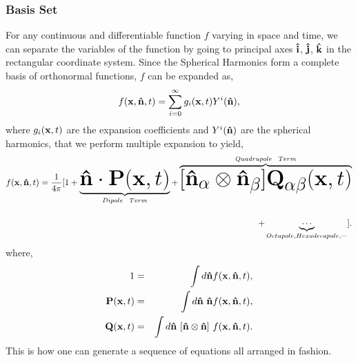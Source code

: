 \documentclass[onecolumn,12pt]{article}
\begin{document}
\subsubsection{Basis Set}
For any continuous and differentiable function $f$ varying in space and time, we can separate the variables of the function by going to principal axes ${\bf \hat{i}}$, ${\bf \hat{j}}$, ${\bf \hat{k}}$ in the rectangular coordinate system. Since the Spherical Harmonics form a complete basis of orthonormal functions,
$f$ can be expanded as,
\begin{equation}
f({\bf x},{\bf \hat{n}},t) = \sum_{i=0}^{\infty} g_i({\bf x},t) Y^i({\bf \hat{n}}), 
\end{equation}
where $g_i({\bf x},t)$ are the expansion coefficients and $Y^i({\bf \hat{n}})$ are the spherical harmonics, that we perform multiple expansion to yield, 
\begin{equation}
\begin{split}
f({\bf x},{\bf \hat{n}},t) = \frac{1}{4\pi} \Huge[1 + 
\underbrace{{\bf \hat{n}} \cdot {\bf P}({\bf x},t)}_{Dipole~Term} 
+ \overbrace{[{\bf \hat{n}}_\alpha \otimes {\bf \hat{n}}_\beta] {\bf Q}_{\alpha\beta}({\bf x},t)}^{Quadrupole~Term} \\
+ \underbrace{\cdots}_{Octupole, Hexadecapole, \cdots} \Huge].
\end{split}
\end{equation}
where, 
\begin{eqnarray}
1 &=& \int d{\bf \hat{n}} f({\bf x},{\bf \hat{n}},t), \\
{\bf P}({\bf x},t) &=& \int d{\bf \hat{n}}~ {\bf \hat{n}} f({\bf x},{\bf \hat{n}},t), \\
{\bf Q}({\bf x},t) &=& \int d{\bf \hat{n}}~ [{{\bf \hat{n}}\otimes{\bf \hat{n}}}] ~f({\bf x},{\bf \hat{n}},t).
\label{nemord}
\end{eqnarray} 
This is how one can generate a sequence of equations all arranged in fashion.
\end{document}
